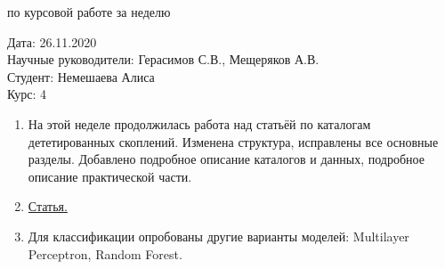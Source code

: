 \documentclass{article}
\begin{document}
\begin{center}{ по курсовой работе за неделю\\}\end{center}
Дата: 26.11.2020\\
Научные руководители: Герасимов С.В., Мещеряков А.В.\\
Студент: Немешаева Алиса\\
Курс: 4\\

\renewcommand{\labelitemi}{$\blacksquare$}
\renewcommand\labelitemii{$\square$}
\begin{enumerate}
    \item На этой неделе продолжилась работа над статьёй по каталогам дететированных скоплений. 
        Изменена структура, исправлены все основные разделы. Добавлено подробное описание каталогов 
        и данных, подробное описание практической части.\\
    \item \hyperlink{https://www.overleaf.com/read/zcgvtyscsyhv}{Статья.}\\
    \item Для классификации опробованы другие варианты моделей: Multilayer Perceptron, Random 
        Forest.\\ 
    
        \begin{figure}[h]


\end{figure}
\end{enumerate}
\end{document}
